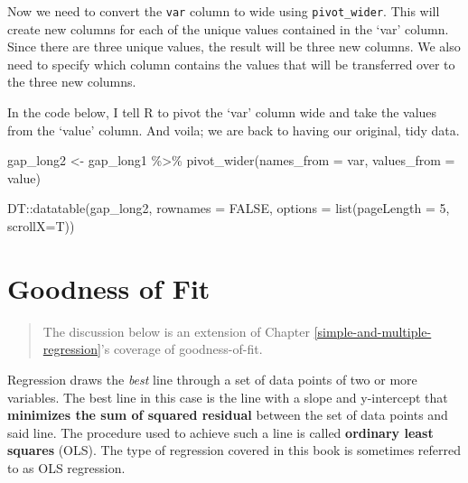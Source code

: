 \documentclass[
]{book}
\makeatletter
\newenvironment{Shaded}{\begin{snugshade}}{\end{snugshade}}
\newcommand{\AttributeTok}[1]{\textcolor[rgb]{0.61,0.61,0.61}{#1}}
\newcommand{\ConstantTok}[1]{\textcolor[rgb]{0,0,0}{#1}}
\newcommand{\DecValTok}[1]{\textcolor[rgb]{0.06,0.06,0.06}{#1}}
\newcommand{\FunctionTok}[1]{\textcolor[rgb]{0,0,0}{#1}}
\newcommand{\NormalTok}[1]{#1}
\newcommand{\OtherTok}[1]{\textcolor[rgb]{0.37,0.37,0.37}{#1}}
\newcommand{\SpecialCharTok}[1]{\textcolor[rgb]{0,0,0}{#1}}
\newenvironment{kframe}{%
\medskip{}
\setlength{\fboxsep}{.8em}
 \def\at@end@of@kframe{}%
 \ifinner\ifhmode%
  \def\at@end@of@kframe{\end{minipage}}%
  \begin{minipage}{\columnwidth}%
 \fi\fi%
 \def\FrameCommand##1{\hskip\@totalleftmargin \hskip-\fboxsep
 \colorbox{shadecolor}{##1}\hskip-\fboxsep
     \hskip-\linewidth \hskip-\@totalleftmargin \hskip\columnwidth}%
 \MakeFramed {\advance\hsize-\width
   \@totalleftmargin\z@ \linewidth\hsize
   \@setminipage}}%
 {\par\unskip\endMakeFramed%
 \at@end@of@kframe}
\renewenvironment{Shaded}{\begin{kframe}}{\end{kframe}}
\makeatother
\begin{document}
\hypertarget{htmlwidget-7fc88bba3c0a6a827e77}{}

Now we need to convert the \texttt{var} column to wide using \texttt{pivot\_wider}. This will create new columns for each of the unique values contained in the `var' column. Since there are three unique values, the result will be three new columns. We also need to specify which column contains the values that will be transferred over to the three new columns.

In the code below, I tell R to pivot the `var' column wide and take the values from the `value' column. And voila; we are back to having our original, tidy data.

\begin{Shaded}
\begin{Highlighting}[]
\NormalTok{gap\_long2 }\OtherTok{\textless{}{-}}\NormalTok{ gap\_long1 }\SpecialCharTok{\%\textgreater{}\%} 
  \FunctionTok{pivot\_wider}\NormalTok{(}\AttributeTok{names\_from =}\NormalTok{ var,}
              \AttributeTok{values\_from =}\NormalTok{ value)}

\NormalTok{DT}\SpecialCharTok{::}\FunctionTok{datatable}\NormalTok{(gap\_long2, }\AttributeTok{rownames =} \ConstantTok{FALSE}\NormalTok{, }\AttributeTok{options =} \FunctionTok{list}\NormalTok{(}\AttributeTok{pageLength =} \DecValTok{5}\NormalTok{, }\AttributeTok{scrollX=}\NormalTok{T))}
\end{Highlighting}
\end{Shaded}

\hypertarget{htmlwidget-12eb49391c984bdcbaff}{}

\hypertarget{appendixC}{%
\chapter{Goodness of Fit}\label{appendixC}}

\begin{quote}
The discussion below is an extension of Chapter \ref{simple-and-multiple-regression}'s coverage of goodness-of-fit.
\end{quote}

Regression draws the \emph{best} line through a set of data points of two or more variables. The best line in this case is the line with a slope and y-intercept that \textbf{minimizes the sum of squared residual} between the set of data points and said line. The procedure used to achieve such a line is called \textbf{ordinary least squares} (OLS). The type of regression covered in this book is sometimes referred to as OLS regression.
\end{document}
